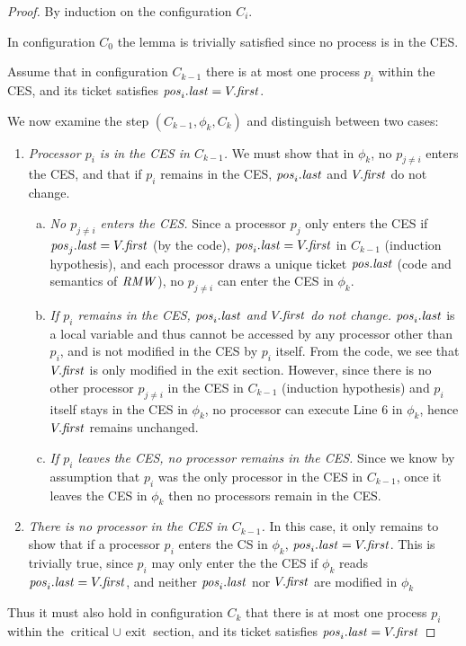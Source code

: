 \begin{proof}
By induction on the configuration $C_i$.

In configuration $C_0$ the lemma is trivially satisfied since no process is in
the CES.

Assume that in configuration $C_{k-1}$ there is at most one process
$p_i$ within the CES, and its ticket
satisfies $\mathit{pos}_i.\mathit{last} = V.\mathit{first}$.

We now examine the step $(C_{k-1}, \phi_k, C_k)$ and distinguish between two cases: 
\begin{enumerate}
\item \emph{Processor $p_i$ is in the CES in $C_{k-1}$.} We must show that in $\phi_k$,
      no $p_{j \neq i}$ enters the CES, and that if $p_i$
      remains in the CES, $\mathit{pos}_i.\mathit{last}$ and $V.\mathit{first}$ do not change.
      \begin{enumerate}[a)]
      \item \emph{No $p_{j \neq i}$ enters the CES.} 
            Since a processor $p_j$ only enters the CES
            if $\mathit{pos}_j.\mathit{last} = V.\mathit{first}$ (by the code),
            $\mathit{pos}_i.\mathit{last} = V.\mathit{first}$ in $C_{k-1}$ (induction hypothesis),
            and each processor draws a unique ticket $\mathit{pos}.\mathit{last}$ (code and
            semantics of $\mathit{RMW}$), no $p_{j \neq i}$ can enter the CES in $\phi_k$.
      \item \emph{If $p_i$ remains in the CES, $\mathit{pos}_i.\mathit{last}$ and $V.\mathit{first}$ 
            do not change.} $\mathit{pos}_i.\mathit{last}$ is a local variable and thus cannot
            be accessed by any processor other than $p_i$, and is not modified 
            in the CES by $p_i$ itself. From the code, we see that $V.\mathit{first}$
            is only modified in the exit section. However, since there is no
            other processor $p_{j \neq i}$ in the CES in $C_{k-1}$
            (induction hypothesis) and $p_i$ itself stays in the CES in $\phi_k$,
            no processor can execute Line 6 in $\phi_k$, hence $V.\mathit{first}$
            remains unchanged.
      \item \emph{If $p_i$ leaves the CES, no processor remains in the CES.}
            Since we know by assumption that $p_i$ was the only processor in
            the CES in $C_{k-1}$, once it leaves the CES in $\phi_k$ then no
            processors remain in the CES.
      \end{enumerate}
\item \emph{There is no processor in the CES in $C_{k-1}$.}
      In this case, it only remains to show that if a processor $p_i$ enters
      the CS in $\phi_k$, $\mathit{pos}_i.\mathit{last} = V.\mathit{first}$. This is trivially true,
      since $p_i$ may only enter the the CES if $\phi_k$ reads
      $\mathit{pos}_i.\mathit{last} = V.\mathit{first}$, and neither $\mathit{pos}_i.\mathit{last}$ nor $V.\mathit{first}$
      are modified in $\phi_k$
\end{enumerate}
Thus it must also hold in configuration $C_k$ that there is at most one process
$p_i$ within the $\text{critical } \cup \text{ exit}$ section, and its ticket
satisfies $\mathit{pos}_i.\mathit{last} = V.\mathit{first}$
\end{proof}


